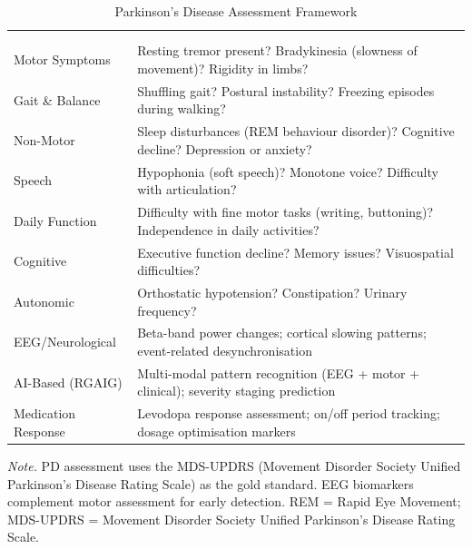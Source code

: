 {\tablestripes\tablefontsize
\begin{xltabular}{\textwidth}{@{} >{\raggedright\arraybackslash}p{3.2cm} L @{}}
\caption{Parkinson's Disease  Assessment Framework}\label{app_tab:pd_assessment} \\
\toprule
{} &  \\
\midrule
\endfirsthead
{} \\
\toprule
{} &  \\
\midrule
\endhead
\bottomrule
\endlastfoot
Motor Symptoms & Resting tremor present? Bradykinesia (slowness of movement)? Rigidity in limbs? \\
\addlinespace
Gait \& Balance & Shuffling gait? Postural instability? Freezing episodes during walking? \\
\addlinespace
Non-Motor & Sleep disturbances (REM behaviour disorder)? Cognitive decline? Depression or anxiety? \\
\addlinespace
Speech & Hypophonia (soft speech)? Monotone voice? Difficulty with articulation? \\
\addlinespace
Daily Function & Difficulty with fine motor tasks (writing, buttoning)? Independence in daily activities? \\
\addlinespace
Cognitive & Executive function decline? Memory issues? Visuospatial difficulties? \\
\addlinespace
Autonomic & Orthostatic hypotension? Constipation? Urinary frequency? \\
\addlinespace
EEG/Neurological & Beta-band power changes; cortical slowing patterns; event-related desynchronisation \\
\addlinespace
AI-Based (RGAIG) & Multi-modal pattern recognition (EEG + motor + clinical); severity staging prediction \\
\addlinespace
Medication Response & Levodopa response assessment; on/off period tracking; dosage optimisation markers \\
\end{xltabular}}
\vspace{0.5em}\noindent\textit{Note.} PD assessment uses the MDS-UPDRS (Movement Disorder Society Unified Parkinson's Disease Rating Scale) as the gold standard. EEG biomarkers complement motor assessment for early detection. REM = Rapid Eye Movement; MDS-UPDRS = Movement Disorder Society Unified Parkinson's Disease Rating Scale.

